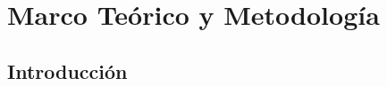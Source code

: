 
\chapter{Marco Teórico y Metodología}
\label{chap:MarcoTeorico}

\section{Introducción}
\label{sec:introduction}


